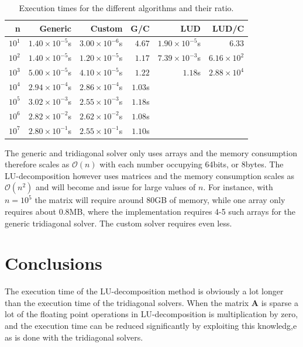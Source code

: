 \documentclass{article}
\begin{document}
\begin{table}[h]
\centering
\begin{tabular}{r|r|r|r|r|r}
n & Generic & Custom & G/C & LUD & LUD/C \\
\hline
$10^{1}$ & $1.40 \times 10^{-5}$s & $3.00 \times 10^{-6}$s & $4.67$ & $1.90 \times 10^{-5}$s & $6.33$ \\
$10^{2}$ & $1.40 \times 10^{-5}$s & $1.20 \times 10^{-5}$s & $1.17$ & $7.39 \times 10^{-3}$s & $6.16 \times 10^{2}$ \\
$10^{3}$ & $5.00 \times 10^{-5}$s & $4.10 \times 10^{-5}$s & $1.22$ & $1.18$s & $2.88 \times 10^{4}$ \\
$10^{4}$ & $2.94 \times 10^{-4}$s & $2.86 \times 10^{-4}$s & $1.03$s & & \\
$10^{5}$ & $3.02 \times 10^{-3}$s & $2.55 \times 10^{-3}$s & $1.18$s & & \\
$10^{6}$ & $2.82 \times 10^{-2}$s & $2.62 \times 10^{-2}$s & $1.08$s & & \\
$10^{7}$ & $2.80 \times 10^{-1}$s & $2.55 \times 10^{-1}$s & $1.10$s & & \\
\hline
\end{tabular}
\caption{Execution times for the different algorithms and their ratio.}
\label{tab:times}
\end{table}

The generic and tridiagonal solver only uses arrays and the memory consumption therefore scales as $\mathcal{O}(n)$ with each number occupying 64bits, or 8bytes. The LU-decomposition however uses matrices and the memory consumption scales as $\mathcal{O}(n^2)$ and will become and issue for large values of $n$. For instance, with $n=10^5$ the matrix will require around 80GB of memory, while one array only requires about 0.8MB, where the implementation requires 4-5 such arrays for the generic tridiagonal solver. The custom solver requires even less.


\section{Conclusions}
\label{sec:conclusions}
The execution time of the LU-decomposition method is obviously a lot longer than the execution time of the tridiagonal solvers. When the matrix $\bm{A}$ is sparse a lot of the floating point operations in LU-decomposition is multiplication by zero, and the execution time can be reduced significantly by exploiting this knowledg,e as is done with the tridiagonal solvers. 
\end{document}
